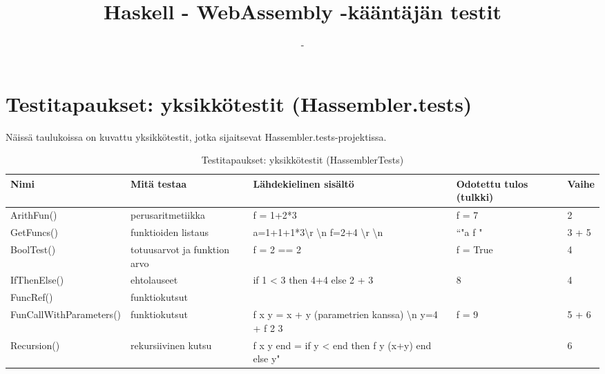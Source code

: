 \documentclass[11pt]{article} %
\title{Haskell - WebAssembly -kääntäjän testit}
\author{-}
\begin{document}
\maketitle


\section{Testitapaukset: yksikkötestit (Hassembler.tests)}

Näissä taulukoissa on kuvattu yksikkötestit, jotka sijaitsevat Hassembler.tests-projektissa.

\begin{table}[!htbp] %
\caption{Testitapaukset: yksikkötestit (HassemblerTests)}
\begin{tabular}{|p{3cm}|p{}|p{4cm}|p{3cm}|p{2cm}|}
\hline
\textbf{Nimi} & \textbf{Mitä testaa} & \textbf{Lähdekielinen sisältö} & \textbf{Odotettu tulos (tulkki)}  & \textbf{Vaihe} \\ \hline
 ArithFun()             & perus\-aritmetiikka         & f = 1+2*3   & f = 7                                  &  2              \\ \hline
 GetFuncs()             & funktioiden listaus   & a=1+1+1*3\textbackslash r \textbackslash n f=2+4 \textbackslash r \textbackslash n                     &  ``"a f "         &   3 + 5                                                \\ \hline
 BoolTest()    & totuusarvot ja funktion arvo  & f = 2 == 2   &  f = True         & 4    \\ \hline
 IfThenElse()    & ehtolauseet                & if 1 < 3 then 4+4 else 2 + 3   &  8         & 4    \\ \hline
 FuncRef()  & funktiokutsut      &                       &           &                                                   \\ \hline
 FunCallWith\-Parameters()   &  funktiokutsut &  f x y = x + y (parametrien kanssa) \textbackslash n   y=4 + f 2 3     & f = 9        &  5 + 6             \\ \hline
 Recursion()   & rekursiivinen kutsu      &  f x y end = if y < end then f y (x+y) end else y"    &           & 6         \\ \hline
              
             
\end{tabular}
\end{table}
\end{document}
